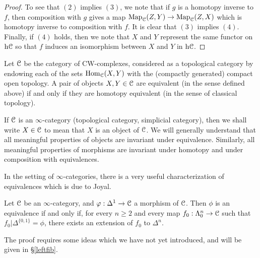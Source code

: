 \begin{1.2.4 Objects, morphisms, equivalences}
\begin{proof}
To see that $(2)$ implies $(3)$, we note that if $g$ is a homotopy
inverse to $f$, then composition with $g$ gives a map
$\operatorname{{Map}}_{\operatorname{\mathcal{C}}}(Z,Y) \rightarrow \operatorname{{Map}}_{\operatorname{\mathcal{C}}}(Z,X)$ which is
homotopy inverse to composition with $f$. It is clear that $(3)$
implies $(4)$. Finally, if $(4)$ holds, then we note that $X$ and
$Y$ represent the same functor on $\rm{h} \it{\operatorname{\mathcal{C}}}$ so that $f$ induces an
isomorphism between $X$ and $Y$ in $\rm{h} \it{\operatorname{\mathcal{C}}}$.
\end{proof}

\begin{example}
Let $\operatorname{\mathcal{C}}$ be the category of CW-complexes, considered as a topological category by endowing
each of the sets $\operatorname{Hom}_{\operatorname{\mathcal{C}}}(X,Y)$ with the (compactly generated) compact open topology. A pair of objects $X,Y \in \operatorname{\mathcal{C}}$ are equivalent (in the sense defined above) if and only if they are homotopy equivalent (in the sense of classical topology).
\end{example}

If $\operatorname{\mathcal{C}}$ is an $\infty$-category (topological category, simplicial category), then we
shall write $X \in \operatorname{\mathcal{C}}$ to mean that $X$ is an object of
$\operatorname{\mathcal{C}}$. We will generally understand that all meaningful properties of
objects are invariant under equivalence. Similarly, all
meaningful properties of morphisms are invariant under
homotopy and under composition with equivalences.

In the setting of $\infty$-categories, there is a very useful characterization of equivalences which is due to Joyal.

\begin{proposition}\label{greenlem}
Let $\operatorname{\mathcal{C}}$ be an $\infty$-category, and $\varphi: \Delta^1 \rightarrow \operatorname{\mathcal{C}}$ a morphism of $\operatorname{\mathcal{C}}$. Then $\phi$ is an equivalence if and only if, for every $n \geq 2$ and every map
$f_0: \Lambda^n_0 \rightarrow \operatorname{\mathcal{C}}$ such that $f_0 | \Delta^{\{0,1\}} = \phi$,
there exists an extension of $f_0$ to $\Delta^n$.
\end{proposition}

The proof requires some ideas which we have not yet introduced, and will be given in \S \ref{leftfib}.
\end{1.2.4 Objects, morphisms, equivalences}
